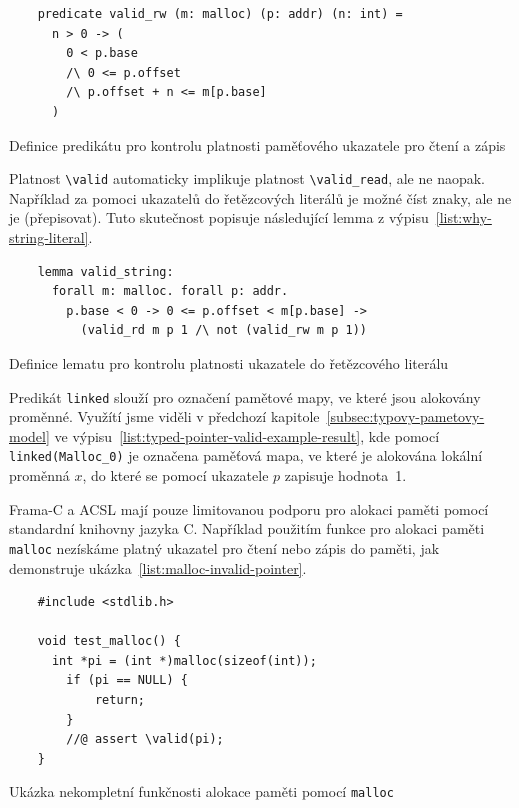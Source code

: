 \begin{listing}[H]
    \begin{verbatim}
    predicate valid_rw (m: malloc) (p: addr) (n: int) =
      n > 0 -> (
        0 < p.base
        /\ 0 <= p.offset
        /\ p.offset + n <= m[p.base]
      )
    \end{verbatim}
    \caption{Definice predikátu pro kontrolu platnosti paměťového ukazatele pro čtení a zápis}
    \label{list:why-pointer-valid}
\end{listing}

Platnost \texttt{\textbackslash valid} automaticky implikuje platnost \texttt{\textbackslash valid\_read},
ale ne naopak.
Například za pomoci ukazatelů do řetězcových literálů je možné číst znaky,
ale ne je (přepisovat).
Tuto skutečnost popisuje následující lemma z výpisu~\ref{list:why-string-literal}.

\begin{listing}[H]
    \begin{verbatim}
    lemma valid_string:
      forall m: malloc. forall p: addr.
        p.base < 0 -> 0 <= p.offset < m[p.base] ->
          (valid_rd m p 1 /\ not (valid_rw m p 1))
    \end{verbatim}
    \caption{Definice lematu pro kontrolu platnosti ukazatele do řetězcového literálu}
    \label{list:why-string-literal}
\end{listing}

Predikát \texttt{linked} slouží pro označení pamětové mapy,
ve které jsou alokovány proměnné.
Využítí jsme viděli v předchozí kapitole~\ref{subsec:typovy-pametovy-model}
ve výpisu~\ref{list:typed-pointer-valid-example-result}, kde pomocí
\texttt{linked(Malloc\_0)} je označena paměťová mapa,
ve které je alokována lokální proměnná $x$,
do které se pomocí ukazatele $p$ zapisuje hodnota~1.

Frama\mbox{-}C a ACSL mají pouze limitovanou podporu pro alokaci paměti pomocí standardní knihovny jazyka C.
Například použitím funkce pro alokaci paměti \texttt{malloc} nezískáme platný ukazatel pro čtení nebo zápis do paměti,
jak demonstruje ukázka~\ref{list:malloc-invalid-pointer}.

\begin{listing}[H]
    \begin{verbatim}
    #include <stdlib.h>

    void test_malloc() {
      int *pi = (int *)malloc(sizeof(int));
        if (pi == NULL) {
            return;
        }
        //@ assert \valid(pi);
    }
    \end{verbatim}
    \caption{Ukázka nekompletní funkčnosti alokace paměti pomocí \texttt{malloc}}
    \label{list:malloc-invalid-pointer}
\end{listing}

